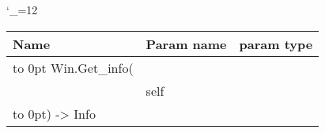 \begingroup \catcode`\_=12 \tt
\begin{tabular}{lll}
\toprule
\textrm{Name}&\textrm{Param name}&\textrm{param type}\\
\midrule
\hbox to 0pt {Win.Get_info(\hss}\\
& self\\
\hbox to 0pt{) -> Info\hss}\\
\bottomrule
\end{tabular}
\endgroup
